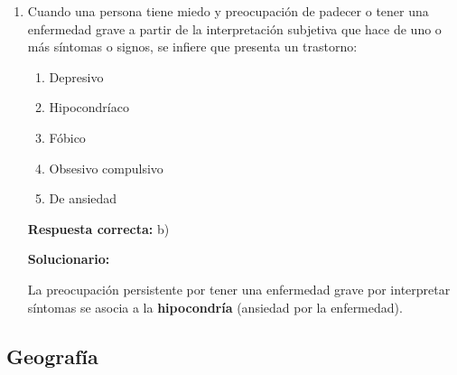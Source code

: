 \begin{enumerate}[resume]
	\textbf{Respuesta correcta:} e)
	
	\vspace{2mm}
	\textbf{Solucionario:}
	
	La definición corresponde a \textbf{aprendizaje}: cambio relativamente estable por experiencia.
	
	\item  Cuando una persona tiene miedo y preocupación de padecer o tener una enfermedad grave a partir de la interpretación subjetiva que hace de uno o más síntomas o signos, se infiere que presenta un trastorno:
	\begin{enumerate}[label=\alph*)]
		\item Depresivo
		\item Hipocondríaco
		\item Fóbico
		\item Obsesivo compulsivo
		\item De ansiedad
	\end{enumerate}
	
	\textbf{Respuesta correcta:} b)
	
	\vspace{2mm}
	\textbf{Solucionario:}
	
	La preocupación persistente por tener una enfermedad grave por interpretar síntomas se asocia a la \textbf{hipocondría} (ansiedad por la enfermedad).
	
	
\end{enumerate}






\subsection*{Geografía}


